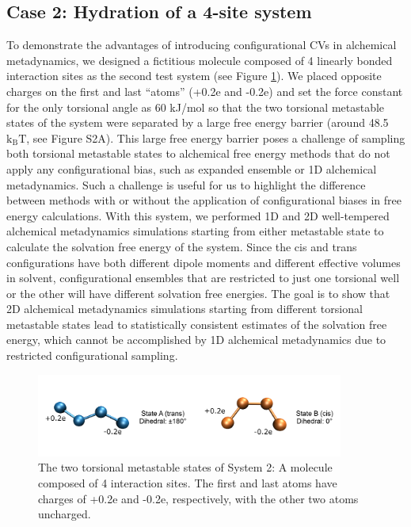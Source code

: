 \documentclass[journal=jacsat,manuscript=article]{achemso}
\begin{document}
\subsection{Case 2: Hydration of a 4-site system}
To demonstrate the advantages of introducing configurational CVs in alchemical metadynamics, we designed a fictitious molecule composed of 4 linearly bonded interaction sites as the second test system (see Figure \ref{sys2}). We placed opposite charges on the first and last ``atoms'' (+0.2e and -0.2e) and set the force constant for the only torsional angle as 60 kJ/mol so that the two torsional metastable states of the system were separated by a large free energy barrier (around 48.5 $\text{k}_{\text{B}}\text{T}$, see Figure S2A). This large free energy barrier poses a challenge of sampling both torsional metastable states to alchemical free energy methods that do not apply any configurational bias, such as expanded ensemble or 1D alchemical metadynamics. Such a challenge is useful for us to highlight the difference between methods with or without the application of configurational biases in free energy calculations. With this system, we performed 1D and 2D well-tempered alchemical metadynamics simulations starting from either metastable state to calculate the solvation free energy of the system. Since the cis and trans configurations have both different dipole moments and different effective volumes in solvent, configurational ensembles that are restricted to just one torsional well or the other will have different solvation free energies. The goal is to show that 2D alchemical metadynamics simulations starting from different torsional metastable states lead to statistically consistent estimates of the solvation free energy, which cannot be accomplished by 1D alchemical metadynamics due to restricted configurational sampling. 

\begin{figure}[ht]
    \centering
    \includegraphics[width=0.9\textwidth]{Figures/sys2_only.png}   
    \caption{The two torsional metastable states of System 2: A molecule composed of 4 interaction sites. The first and last atoms have charges of +0.2e and -0.2e, respectively, with the other two atoms uncharged.}
    \label{sys2}
\end{figure}
\end{document}
